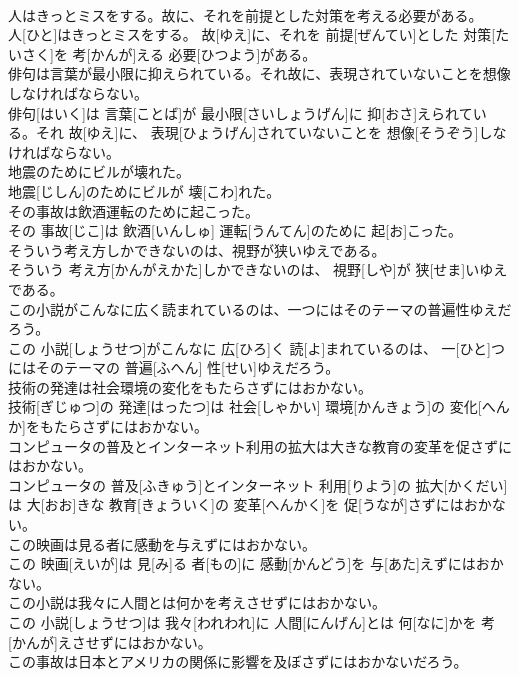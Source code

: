 \documentclass[8pt]{extreport}
\begin{document}
\begin{CJK}{UTF8}{min}
\\	人はきっとミスをする。故に、それを前提とした対策を考える必要がある。	
\\	人[ひと]はきっとミスをする。 故[ゆえ]に、それを 前提[ぜんてい]とした 対策[たいさく]を 考[かんが]える 必要[ひつよう]がある。
\\	俳句は言葉が最小限に抑えられている。それ故に、表現されていないことを想像しなければならない。	
\\	俳句[はいく]は 言葉[ことば]が 最小限[さいしょうげん]に 抑[おさ]えられている。それ 故[ゆえ]に、 表現[ひょうげん]されていないことを 想像[そうぞう]しなければならない。
\\	地震のためにビルが壊れた。	
\\	地震[じしん]のためにビルが 壊[こわ]れた。
\\	その事故は飲酒運転のために起こった。	
\\	その 事故[じこ]は 飲酒[いんしゅ] 運転[うんてん]のために 起[お]こった。
\\	そういう考え方しかできないのは、視野が狭いゆえである。	
\\	そういう 考え方[かんがえかた]しかできないのは、 視野[しや]が 狭[せま]いゆえである。
\\	この小説がこんなに広く読まれているのは、一つにはそのテーマの普遍性ゆえだろう。	
\\	この 小説[しょうせつ]がこんなに 広[ひろ]く 読[よ]まれているのは、 一[ひと]つにはそのテーマの 普遍[ふへん] 性[せい]ゆえだろう。
\\	技術の発達は社会環境の変化をもたらさずにはおかない。	
\\	技術[ぎじゅつ]の 発達[はったつ]は 社会[しゃかい] 環境[かんきょう]の 変化[へんか]をもたらさずにはおかない。
\\	コンピュータの普及とインターネット利用の拡大は大きな教育の変革を促さずにはおかない。	
\\	コンピュータの 普及[ふきゅう]とインターネット 利用[りよう]の 拡大[かくだい]は 大[おお]きな 教育[きょういく]の 変革[へんかく]を 促[うなが]さずにはおかない。
\\	この映画は見る者に感動を与えずにはおかない。	
\\	この 映画[えいが]は 見[み]る 者[もの]に 感動[かんどう]を 与[あた]えずにはおかない。
\\	この小説は我々に人間とは何かを考えさせずにはおかない。	
\\	この 小説[しょうせつ]は 我々[われわれ]に 人間[にんげん]とは 何[なに]かを 考[かんが]えさせずにはおかない。
\\	この事故は日本とアメリカの関係に影響を及ぼさずにはおかないだろう。	

\end{CJK}
\end{document}

